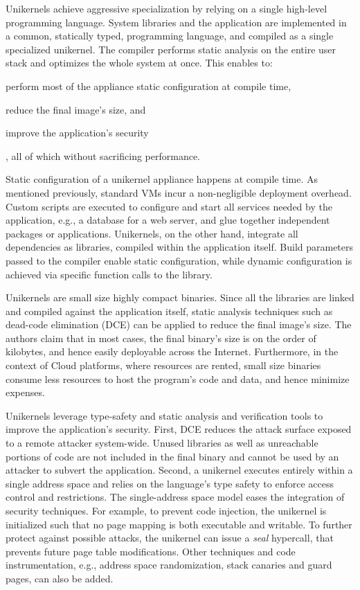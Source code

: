 Unikernels achieve aggressive specialization by relying on a single high-level programming language.
System libraries and the application are implemented in a common, statically typed, programming language, and compiled as a single specialized unikernel.
The compiler performs static analysis on the entire user stack and optimizes the whole system at once.
This enables to:
\begin{enumerate*}
	\item perform most of the appliance static configuration at compile time,
	\item reduce the final image's size, and
	\item improve the application's security
\end{enumerate*}, all of which without sacrificing performance.

Static configuration of a unikernel appliance happens at compile time.
As mentioned previously, standard VMs incur a non-negligible deployment overhead.
Custom scripts are executed to configure and start all services needed by the application, e.g., a database for a web server, and glue together independent packages or applications.
Unikernels, on the other hand, integrate all dependencies as libraries, compiled within the application itself.
Build parameters passed to the compiler enable static configuration, while dynamic configuration is achieved via specific function calls to the library.

Unikernels are small size highly compact binaries.
Since all the libraries are linked and compiled against the application itself, static analysis techniques such as dead-code elimination (DCE) can be applied to reduce the final image's size.
The authors claim that in most cases, the final binary's size is on the order of kilobytes, and hence easily deployable across the Internet.
Furthermore, in the context of Cloud platforms, where resources are rented, small size binaries consume less resources to host the program's code and data, and hence minimize expenses.

Unikernels leverage type-safety and static analysis and verification tools to improve the application's security.
First, DCE reduces the attack surface exposed to a remote attacker system-wide.
Unused libraries as well as unreachable portions of code are not included in the final binary and cannot be used by an attacker to subvert the application.
Second, a unikernel executes entirely within a single address space and relies on the language's type safety to enforce access control and restrictions.
The single-address space model eases the integration of security techniques. 
For example, to prevent code injection, the unikernel is initialized such that no page mapping is both executable and writable.
To further protect against possible attacks, the unikernel can issue a \emph{seal} hypercall, that prevents future page table modifications.
Other techniques and code instrumentation, e.g., address space randomization, stack canaries and guard pages, can also be added.

